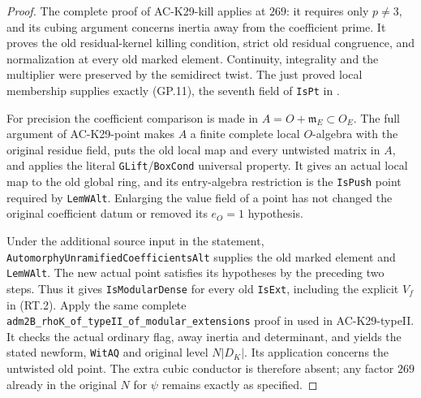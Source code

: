 \begin{proof}
The complete proof of AC-K29-kill applies at \(269\):
it requires only \(p\ne3\), and its cubing argument
concerns inertia away from the coefficient prime.
It proves the old residual-kernel killing condition,
strict old residual congruence, and normalization at
every old marked element. Continuity, integrality and
the multiplier were preserved by the semidirect twist.
The just proved local membership supplies exactly
(GP.11), the seventh field of \texttt{IsPt} in
.

For precision the coefficient comparison is made in
\(A=O+\mathfrak m_E\subset O_E\). The full argument
of AC-K29-point makes \(A\) a finite complete local
\(O\)-algebra with the original residue field, puts
the old local map and every untwisted matrix in \(A\),
and applies the literal \texttt{GLift}/\texttt{BoxCond}
universal property. It gives an actual local map to
the old global ring, and its entry-algebra restriction
is the \texttt{IsPush} point required by
\texttt{LemWAlt}. Enlarging the value field of a point
has not changed the original coefficient datum or
removed its \(e_O=1\) hypothesis.

Under the additional source input in the statement,
\texttt{AutomorphyUnramifiedCoefficientsAlt} supplies
the old marked element and \texttt{LemWAlt}.
The new actual point satisfies its hypotheses by the
preceding two steps. Thus it gives
\texttt{IsModularDense} for every old \texttt{IsExt},
including the explicit \(V_f\) in (RT.2).
Apply the same complete
\texttt{adm2B\_rhoK\_of\_typeII\_of\_modular\_extensions}
proof in 
used in AC-K29-typeII. It checks the actual ordinary
flag, away inertia and determinant, and yields the
stated newform, \texttt{WitAQ} and original level
\(N|D_K|\). Its application concerns the untwisted
old point. The extra cubic conductor is therefore
absent; any factor \(269\) already in the original
\(N\) for \(\psi\) remains exactly as specified.
\end{proof}


